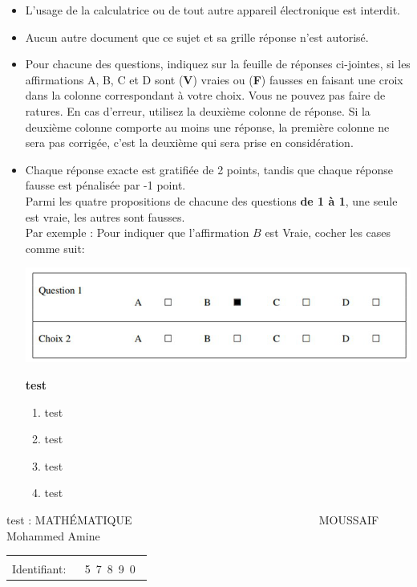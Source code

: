 \documentclass{book}%
\begin{document}
\begin{itemize}%
\item%
L'usage de la calculatrice ou de tout autre appareil électronique est interdit.%
\item%
Aucun autre document que ce sujet et sa grille réponse n'est autorisé.%
\item%
Pour chacune des questions, indiquez sur la feuille de réponses ci-jointes, si les affirmations A, B, C et D sont (\textbf{V}) vraies ou (\textbf{F}) fausses en faisant une croix dans la colonne correspondant à votre choix. Vous ne pouvez pas faire de ratures. En cas d'erreur, utilisez la deuxième colonne de réponse. Si la deuxième colonne comporte au moins une réponse, la première colonne ne sera pas corrigée, c'est la deuxième qui sera prise en considération.%
\item%
Chaque réponse exacte est gratifiée de 2 points, tandis que chaque réponse fausse est pénalisée par -1 point. \\ 	Parmi les quatre propositions de chacune des questions \textbf{de 1 à 1}, une seule est vraie, les autres sont fausses. \\ 	Par exemple : Pour indiquer que l'affirmation $B$ est Vraie, cocher les cases comme suit:  \\ \begin{center}	\includegraphics[scale=0.8]{reponses.png} \end{center}%
\thispagestyle{empty}%
\begin{exercise}%
\textbf{test }%
\begin{enumerate}[label=\textbf{\Alph*. }]%
\item%
test%
\item%
test%
\item%
test%
\item%
test%
\end{enumerate}%
\end{exercise}%
\end{itemize}%
\newpage%
\thispagestyle{empty}%
test : MATHÉMATIQUE $\qquad \qquad \qquad \qquad \qquad \qquad \qquad \qquad$ MOUSSAIF Mohammed Amine%
\begin{flushright}%
\begin{tabular}{|l|}%
\hline%
 \\%
\thispagestyle{empty}%
Identifiant: $\quad$ {\Large 5~7~8~9~0~}%
 \\%
\hline%
\end{tabular}%
\end{flushright}%
\end{document}
